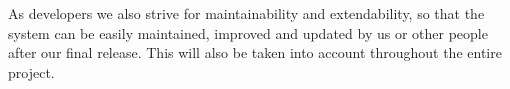As developers we also strive for maintainability and extendability, so that the system can be easily maintained, improved and updated by us or other people after our final release. This will also be taken into account throughout the entire project.

